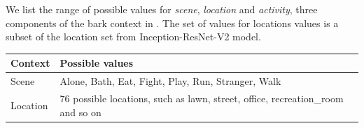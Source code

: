 We list the range of possible values for {\em scene}, {\em location}
and {\em activity}, three components of the bark context in . The set of values for locations values is a subset of the location set from Inception-ResNet-V2 model. 


\begin{table}[th]
\small
\begin{tabular}{p{}|p{}}
\toprule
\textbf{Context} & \textbf{Possible values} \\ \midrule
Scene & Alone, Bath, Eat, Fight, Play, Run, Stranger, Walk \\ \midrule

Location & 76 possible locations, such as lawn, street, office, recreation\_room and so on \\ \midrule


\end{tabular}
\end{table}
